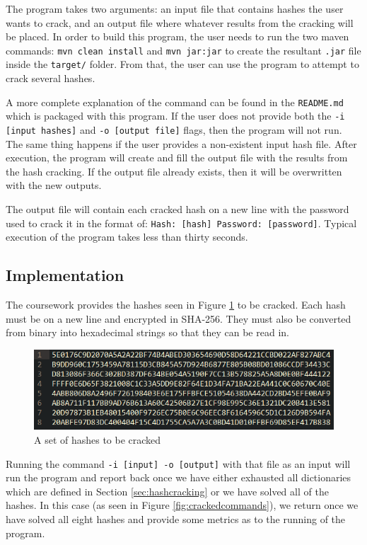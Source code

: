 \documentclass[10pt,journal,compsoc]{IEEEtran}
\begin{document}
The program takes two arguments: an input file that contains hashes the user
wants to crack, and an output file where whatever results from the cracking
will be placed. In order to build this program, the user needs to run the two
maven commands: \texttt{mvn clean install} and \texttt{mvn jar:jar} to create
the resultant \texttt{.jar} file inside the \texttt{target/} folder. From that,
the user can use the program to attempt to crack several hashes.

A more complete explanation of the command can be found in the
\texttt{README.md} which is packaged with this program. If the user does not
provide both the \texttt{-i [input hashes]} and \texttt{-o [output file]}
flags, then the program will not run. The same thing happens if the user
provides a non-existent input hash file. After execution, the program will
create and fill the output file with the results from the hash cracking. If the
output file already exists, then it will be overwritten with the new outputs.

The output file will contain each cracked hash on a new line with the password
used to crack it in the format of: \texttt{Hash: [hash] Password: [password]}.
Typical execution of the program takes less than thirty seconds.

\subsection{Implementation}

The coursework provides the hashes seen in Figure \ref{fig:crackedhashes} to be
cracked. Each hash must be on a new line and encrypted in SHA-256. They must
also be converted from binary into hexadecimal strings so that they can be read
in.

\begin{figure}[h!]
	\centering
	\includegraphics[width=0.8\linewidth]{images/cracked_hashes}
	\caption{A set of hashes to be cracked}
	\label{fig:crackedhashes}
\end{figure}

Running the command \texttt{-i [input] -o [output]} with that file as an input
will run the program and report back once we have either exhausted all
dictionaries which are defined in Section \ref{sec:hashcracking} or we have
solved all of the hashes. In this case (as seen in Figure
\ref{fig:crackedcommands}), we return once we have solved all eight hashes and
provide some metrics as to the running of the program.
\end{document}
